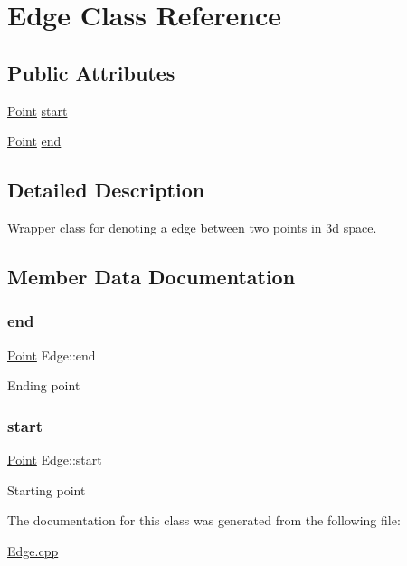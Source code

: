 \hypertarget{class_edge}{}\section{Edge Class Reference}
\label{class_edge}
\subsection*{Public Attributes}
\begin{DoxyCompactItemize}
\item 
\hyperlink{class_point}{Point} \hyperlink{class_edge_a7e0b8134fab7b96b7fd296a538e0ac24}{start}
\item 
\hyperlink{class_point}{Point} \hyperlink{class_edge_acd3ac3ef2f1ad3914ba2b9609d0a3924}{end}
\end{DoxyCompactItemize}


\subsection{Detailed Description}
Wrapper class for denoting a edge between two points in 3d space. 

\subsection{Member Data Documentation}
\mbox{\label{class_edge_acd3ac3ef2f1ad3914ba2b9609d0a3924}} 
\subsubsection{\texorpdfstring{end}{end}}
{\footnotesize\ttfamily \hyperlink{class_point}{Point} Edge\+::end}

Ending point \mbox{\label{class_edge_a7e0b8134fab7b96b7fd296a538e0ac24}} 
\subsubsection{\texorpdfstring{start}{start}}
{\footnotesize\ttfamily \hyperlink{class_point}{Point} Edge\+::start}

Starting point 

The documentation for this class was generated from the following file\+:\begin{DoxyCompactItemize}
\item 
\hyperlink{_edge_8cpp}{Edge.\+cpp}\end{DoxyCompactItemize}
